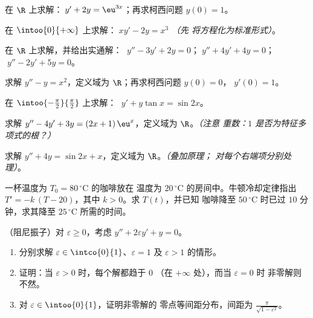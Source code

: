 \begin{exercise}[$\star$]\label{exo:b1:diffeq:1}
在 $\R$ 上求解：$\;y' + 2y = \eu^{3x}$；再求柯西问题 $y(0) =
1$。
\end{exercise}

\begin{exercise}[$\star$]\label{exo:b1:diffeq:2}
在 $\intoo{0}{+\infty}$ 上求解：$\;x y' - 2y = x^3$ \emph{（先
将方程化为标准形式）}。
\end{exercise}

\begin{exercise}[$\star$]\label{exo:b1:diffeq:3}
在 $\R$ 上求解，并给出实通解：
$\;y'' - 3y' + 2y = 0$；$\;y'' + 4y' + 4y = 0$；$\;y'' - 2y' + 5y =
0$。
\end{exercise}

\begin{exercise}[$\star$]\label{exo:b1:diffeq:4}
求解 $y'' - y = x^2$，定义域为 $\R$；再求柯西问题 $y(0) = 0$，
$y'(0) = 1$。
\end{exercise}

\begin{exercise}[$\star\star$]\label{exo:b1:diffeq:5}
在 $\intoo{-\frac\pi2}{\frac\pi2}$ 上求解：
$\;y' + y\tan x = \sin 2x$。
\end{exercise}

\begin{exercise}[$\star\star$]\label{exo:b1:diffeq:6}
求解 $y'' - 4y' + 3y = (2x + 1)\,\eu^{x}$，定义域为 $\R$。\emph{（注意
重数：$1$ 是否为特征多项式的根？）}
\end{exercise}

\begin{exercise}[$\star\star$]\label{exo:b1:diffeq:7}
求解 $y'' + 4y = \sin 2x + x$，定义域为 $\R$。\emph{（叠加原理；
对每个右端项分别处理）}。
\end{exercise}

\begin{exercise}[$\star\star$]\label{exo:b1:diffeq:8}
一杯温度为 $T_0 = 80\,^\circ$C 的咖啡放在
温度为 $20\,^\circ$C 的房间中。牛顿冷却定律指出 $T' = -k\,(T - 20)$，其中
$k > 0$。求 $T(t)$，并已知
咖啡降至 $50\,^\circ$C 时已过 $10$ 分钟，求其降至
$25\,^\circ$C 所需的时间。
\end{exercise}

\begin{exercise}[$\star\star\star$]\label{exo:b1:diffeq:9}
（阻尼振子）对 $\varepsilon \geq 0$，考虑
$y'' + 2\varepsilon y' + y = 0$。
\begin{enumerate}
  \item 分别求解 $\varepsilon \in \intco{0}{1}$、$\varepsilon = 1$
        及 $\varepsilon > 1$ 的情形。
  \item 证明：当 $\varepsilon > 0$ 时，每个解都趋于 $0$
        （在 $+\infty$ 处），而当 $\varepsilon = 0$ 时
        非零解则不然。
  \item 对 $\varepsilon \in \intoo{0}{1}$，证明非零解的
        零点等间距分布，间距为
        $\frac{\pi}{\sqrt{1 - \varepsilon^2}}$。
\end{enumerate}
\end{exercise}

